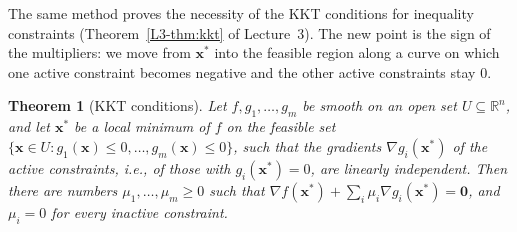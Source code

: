 \documentclass[11pt]{article}
\theoremstyle{definition}
\theoremstyle{plain}
\newtheorem{theorem}[definition]{Theorem}
\theoremstyle{remark}
\begin{document}
The same method proves the necessity of the KKT conditions for inequality constraints (Theorem~\ref{L3-thm:kkt} of Lecture~3). The new point is the sign of the multipliers: we move from $\mathbf{x}^*$ into the feasible region along a curve on which one active constraint becomes negative and the other active constraints stay $0$.

\begin{theorem}[KKT conditions]\label{thm:kkt-proof}
    Let $f, g_1, \ldots, g_m$ be smooth on an open set $U \subseteq \mathbb{R}^n$, and let $\mathbf{x}^*$ be a local minimum of $f$ on the feasible set $\{\mathbf{x} \in U : g_1(\mathbf{x}) \leq 0, \ldots, g_m(\mathbf{x}) \leq 0\}$, such that the gradients $\nabla g_i(\mathbf{x}^*)$ of the active constraints, i.e., of those with $g_i(\mathbf{x}^*) = 0$, are linearly independent. Then there are numbers $\mu_1, \ldots, \mu_m \geq 0$ such that $\nabla f(\mathbf{x}^*) + \sum_i \mu_i\nabla g_i(\mathbf{x}^*) = \mathbf{0}$, and $\mu_i = 0$ for every inactive constraint.
\end{theorem}
\end{document}
